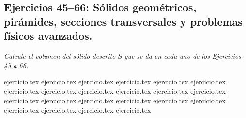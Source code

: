 \subsection*{Ejercicios 45--66: Sólidos geométricos, pirámides, secciones transversales y problemas físicos avanzados.}

\noindent \textit{Calcule el volumen del sólido descrito $S$ que se da en cada uno de los Ejercicios 45 a 66.}

\begin{enumerate}
    \setcounter{enumi}{44}
    {ejercicio.tex}
    {ejercicio.tex}
    {ejercicio.tex}
    {ejercicio.tex}
    {ejercicio.tex}
    {ejercicio.tex}
    {ejercicio.tex}
    {ejercicio.tex}
    {ejercicio.tex}
    {ejercicio.tex}
    {ejercicio.tex}
    {ejercicio.tex}
    {ejercicio.tex}
    {ejercicio.tex}
    {ejercicio.tex}
    {ejercicio.tex}
    {ejercicio.tex}
    {ejercicio.tex}
    {ejercicio.tex}
    {ejercicio.tex}
    {ejercicio.tex}
    {ejercicio.tex}
\end{enumerate}
